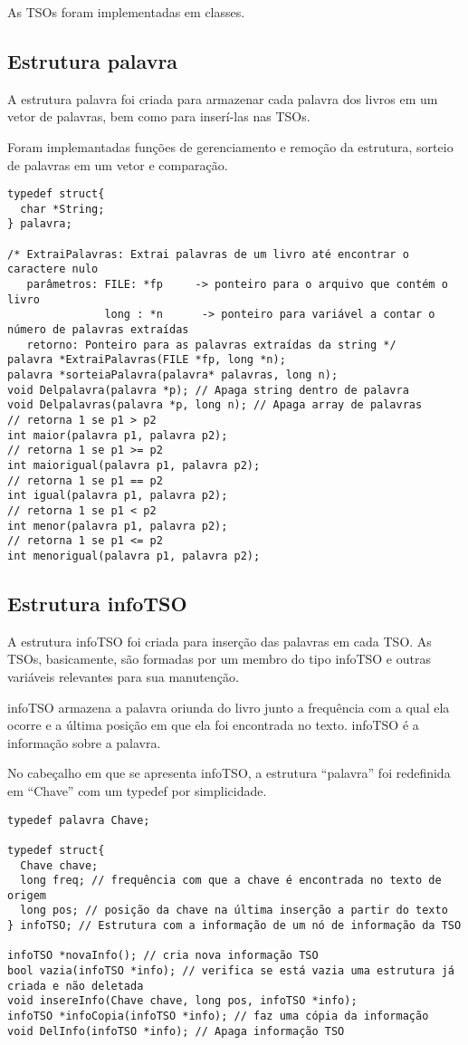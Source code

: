 \documentclass[a4paper]{article}
\begin{document}
As TSOs foram implementadas em classes.

\subsection{Estrutura palavra}
A estrutura palavra foi criada para armazenar cada palavra dos livros em um vetor de palavras, bem como para inserí-las nas TSOs.

Foram implemantadas funções de gerenciamento e remoção da estrutura, sorteio de palavras em um vetor e comparação.

\begin{verbatim}
typedef struct{
  char *String;
} palavra;

/* ExtraiPalavras: Extrai palavras de um livro até encontrar o caractere nulo
   parâmetros: FILE: *fp     -> ponteiro para o arquivo que contém o livro
               long : *n      -> ponteiro para variável a contar o número de palavras extraídas
   retorno: Ponteiro para as palavras extraídas da string */
palavra *ExtraiPalavras(FILE *fp, long *n);
palavra *sorteiaPalavra(palavra* palavras, long n);
void Delpalavra(palavra *p); // Apaga string dentro de palavra
void Delpalavras(palavra *p, long n); // Apaga array de palavras
// retorna 1 se p1 > p2
int maior(palavra p1, palavra p2);
// retorna 1 se p1 >= p2
int maiorigual(palavra p1, palavra p2);
// retorna 1 se p1 == p2
int igual(palavra p1, palavra p2);
// retorna 1 se p1 < p2
int menor(palavra p1, palavra p2);
// retorna 1 se p1 <= p2
int menorigual(palavra p1, palavra p2);
\end{verbatim}

\subsection{Estrutura infoTSO}
A estrutura infoTSO foi criada para inserção das palavras em cada TSO. As TSOs, basicamente, são formadas por um membro do tipo infoTSO e outras variáveis relevantes para sua manutenção.

infoTSO armazena a palavra oriunda do livro junto a frequência com a qual ela ocorre e a última posição em que ela foi encontrada no texto. infoTSO é a informação sobre a palavra.

No cabeçalho em que se apresenta infoTSO, a estrutura ``palavra'' foi redefinida em ``Chave'' com um typedef por simplicidade.

\begin{verbatim}
typedef palavra Chave;

typedef struct{
  Chave chave;
  long freq; // frequência com que a chave é encontrada no texto de origem
  long pos; // posição da chave na última inserção a partir do texto
} infoTSO; // Estrutura com a informação de um nó de informação da TSO

infoTSO *novaInfo(); // cria nova informação TSO
bool vazia(infoTSO *info); // verifica se está vazia uma estrutura já criada e não deletada
void insereInfo(Chave chave, long pos, infoTSO *info);
infoTSO *infoCopia(infoTSO *info); // faz uma cópia da informação
void DelInfo(infoTSO *info); // Apaga informação TSO
\end{verbatim}
\end{document}
